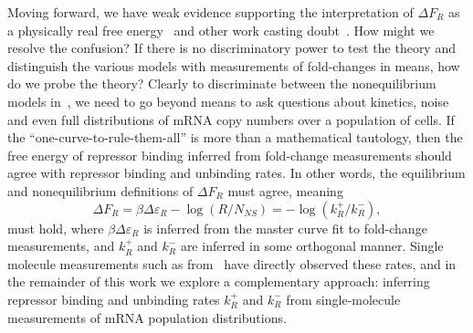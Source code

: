 Moving forward, we have weak evidence supporting the interpretation of $\Delta
F_R$ as a physically real free energy~\cite{Landman2019} and other work casting
doubt~\cite{Hammar2014}. How might we resolve the confusion? If there is no
discriminatory power to test the theory and distinguish the various models with
measurements of fold-changes in means, how do we probe the theory? Clearly to
discriminate between the nonequilibrium models in~, we
need to go beyond means to ask questions about kinetics, noise and even full
distributions of mRNA copy numbers over a population of cells. If the
``one-curve-to-rule-them-all'' is more than a mathematical tautology, then the
free energy of repressor binding inferred from fold-change measurements should
agree with repressor binding and unbinding rates. In other words, the
equilibrium and nonequilibrium definitions of $\Delta F_R$ must agree, meaning
\begin{equation}
\Delta F_R = \beta\Delta\varepsilon_R - \log(R/N_{NS})
        = - \log(k_R^+/k_R^-),
\label{eq:deltaFR_eq_noneq_equiv}
\end{equation}
must hold, where $\beta\Delta\varepsilon_R$ is inferred from the master curve
fit to fold-change measurements, and $k_R^+$ and $k_R^-$ are inferred in some
orthogonal manner. Single molecule measurements such as from~\cite{Hammar2014}
have directly observed these rates, and in the remainder of this work we explore
a complementary approach: inferring repressor binding and unbinding rates
$k_R^+$ and $k_R^-$ from single-molecule measurements of mRNA population
distributions.